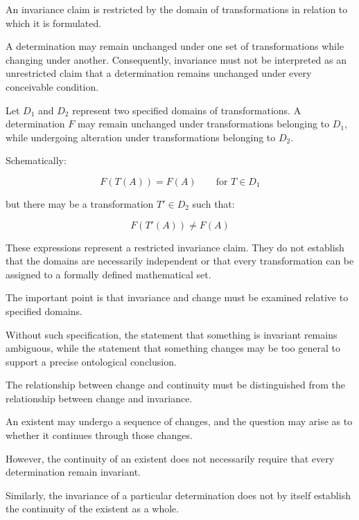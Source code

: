 
An invariance claim is restricted by the
domain of transformations in relation to
which it is formulated.

A determination may remain unchanged under
one set of transformations while changing
under another. Consequently, invariance
must not be interpreted as an unrestricted
claim that a determination remains unchanged
under every conceivable condition.

Let \(D_1\) and \(D_2\) represent two
specified domains of transformations.
A determination \(F\) may remain unchanged
under transformations belonging to \(D_1\),
while undergoing alteration under
transformations belonging to \(D_2\).

Schematically:

\[
F(T(A)) = F(A)
\qquad
\text{for } T \in D_1
\]

but there may be a transformation
\(T' \in D_2\) such that:

\[
F(T'(A)) \neq F(A)
\]

These expressions represent a restricted
invariance claim. They do not establish
that the domains are necessarily independent
or that every transformation can be assigned
to a formally defined mathematical set.

The important point is that invariance
and change must be examined relative to
specified domains.

Without such specification, the statement
that something is invariant remains
ambiguous, while the statement that
something changes may be too general
to support a precise ontological conclusion.


The relationship between change and
continuity must be distinguished from
the relationship between change and
invariance.

An existent may undergo a sequence of
changes, and the question may arise as
to whether it continues through those
changes.

However, the continuity of an existent
does not necessarily require that every
determination remain invariant.

Similarly, the invariance of a particular
determination does not by itself establish
the continuity of the existent as a whole.

